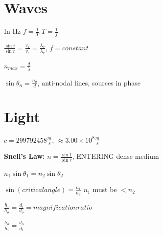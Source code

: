 \documentclass[11pt]{article}
\begin{document}
\section{Waves}
\begin{multicols}{2}

In Hz $f=\frac{1}{T}$ \overrightarrow{} $T=\frac{1}{f}$

$\frac{\sin i}{\sin r}=\frac{v_{x}}{v_{r}}=\frac{\lambda_{x}}{\lambda_{r}}$, $f=constant$

$n_{max}=\frac{d}{\lambda}$

$\sin \theta_{n}=\frac{n_{\theta}}{d}$, anti-nodal lines, sources in phase
\end{multicols}

\section{Light}
\begin{multicols}{2}

$c=299792458\frac{m}{s}$, $\approx 3.00\times 10^8\frac{m}{s}$

\textbf{Snell's Law:} $n=\frac{\sin 1}{\sin r}$, ENTERING dense medium

$n_{1}\sin \theta_{1}=n_{2} \sin \theta_{2}$

$\sin (critical angle)=\frac{n_{1}}{n_{2}}$ $n_{1}$ must be $<n_{2}$

$\frac{h_{i}}{h_{o}}=\frac{d_{i}}{d_{o}}=magnification ratio$

$\frac{h_{o}}{h_{i}}=\frac{d_{o}}{d_{i}}$

\end{multicols}

\singlespacing
\end{document}
